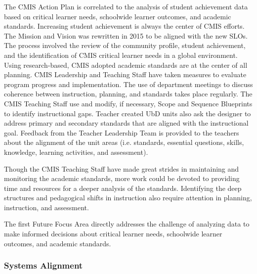 
\begin{findings}
The CMIS Action Plan is correlated to the analysis of student achievement data based on critical learner needs, schoolwide learner outcomes, and academic standards.
Increasing student achievement is always the center of CMIS efforts. The Mission and Vision was rewritten in 2015 to be aligned with the new SLOs. The process involved the review of the community profile, student achievement, and the identification of CMIS critical learner needs in a global environment.
Using research-based, CMIS adopted academic standards are at the center of all planning. CMIS Leadership and Teaching Staff have taken measures to evaluate program progress and implementation. The use of department meetings to discuss coherence between instruction, planning, and standards takes place regularly. The CMIS Teaching Staff use and modify, if necessary, Scope and Sequence Blueprints to identify instructional gaps. Teacher created UbD units also ask the designer to address primary and secondary standards that are aligned with the instructional goal. Feedback from the Teacher Leadership Team is provided to the teachers about the alignment of the unit areas (i.e. standards, essential questions, skills, knowledge, learning activities, and assessment). 


Though the CMIS Teaching Staff have made great strides in maintaining and monitoring the academic standards, more work could be devoted to providing time and resources for a deeper analysis of the standards. Identifying the deep structures and pedagogical shifts in instruction also require attention in planning, instruction, and assessment.  

The first Future Focus Area directly addresses the challenge of analyzing data to make informed decisions about critical learner needs, schoolwide learner outcomes, and academic standards. 
\end{findings}

\subsubsection{Systems Alignment}


